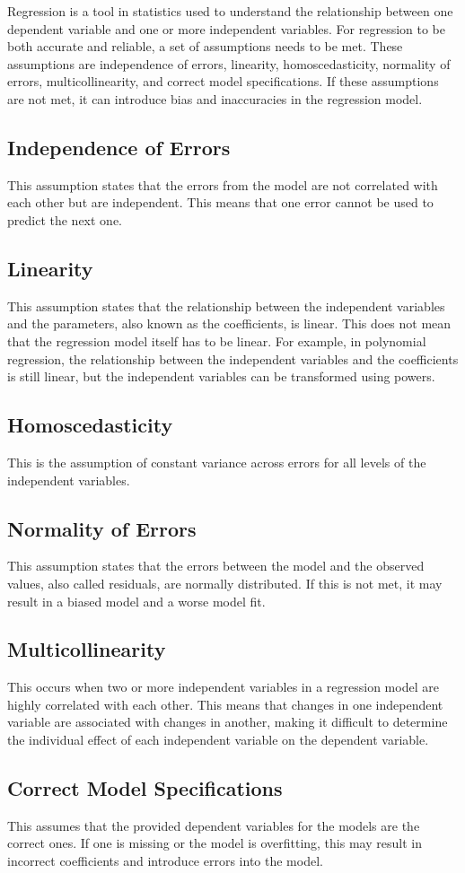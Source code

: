 
Regression is a tool in statistics used to understand the relationship between one dependent variable and one or more independent variables. For regression to be both accurate and reliable, a set of assumptions needs to be met. These assumptions are independence of errors, linearity, homoscedasticity, normality of errors, multicollinearity, and correct model specifications. If these assumptions are not met, it can introduce bias and inaccuracies in the regression model.

\subsection{Independence of Errors}
This assumption states that the errors from the model are not correlated with each other but are independent. This means that one error cannot be used to predict the next one.

\subsection{Linearity}
This assumption states that the relationship between the independent variables and the parameters, also known as the coefficients, is linear. This does not mean that the regression model itself has to be linear. For example, in polynomial regression, the relationship between the independent variables and the coefficients is still linear, but the independent variables can be transformed using powers.

\subsection{Homoscedasticity}
This is the assumption of constant variance across errors for all levels of the independent variables.

\subsection{Normality of Errors}
This assumption states that the errors between the model and the observed values, also called residuals, are normally distributed. If this is not met, it may result in a biased model and a worse model fit.

\subsection{Multicollinearity}
This occurs when two or more independent variables in a regression model are highly correlated with each other. This means that changes in one independent variable are associated with changes in another, making it difficult to determine the individual effect of each independent variable on the dependent variable.

\subsection{Correct Model Specifications}
This assumes that the provided dependent variables for the models are the correct ones. If one is missing or the model is overfitting, this may result in incorrect coefficients and introduce errors into the model.